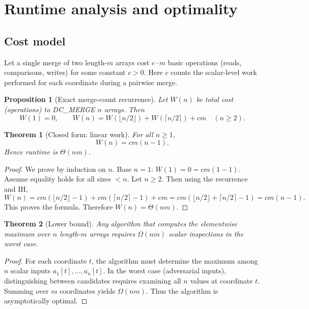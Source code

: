 \documentclass[11pt]{article}
\newtheorem{theorem}{Theorem}
\newtheorem{proposition}{Proposition}
\begin{document}
\section{Runtime analysis and optimality}
\subsection{Cost model}
Let a single merge of two length-\(m\) arrays cost \(c\cdot m\) basic operations (reads, comparisons, writes) for some constant \(c>0\). Here \(c\) counts the scalar-level work performed for each coordinate during a pairwise merge.

\begin{proposition}[Exact merge-count recurrence]
Let \(W(n)\) be total cost (operations) to DC\_MERGE \(n\) arrays. Then
\[
W(1)=0,\qquad
W(n) = W(\lfloor n/2\rfloor) + W(\lceil n/2\rceil) + c m \quad (n\ge 2).
\]
\end{proposition}

\begin{theorem}[Closed form: linear work]
For all \(n\ge 1\),
\[
W(n) = c m (n-1).
\]
Hence runtime is \(\Theta(nm)\).
\end{theorem}

\begin{proof}
We prove by induction on \(n\). Base \(n=1\): \(W(1)=0=c m (1-1)\). Assume equality holds for all sizes \(<n\). Let \(n\ge2\). Then using the recurrence and IH,
\[
W(n) = c m (\lfloor n/2\rfloor -1) + c m (\lceil n/2\rceil -1) + c m
= c m (\lfloor n/2\rfloor + \lceil n/2\rceil -1)
= c m (n-1).
\]
This proves the formula. Therefore \(W(n)=\Theta(nm)\).
\end{proof}

\begin{theorem}[Lower bound]
Any algorithm that computes the elementwise maximum over \(n\) length-\(m\) arrays requires \(\Omega(nm)\) scalar inspections in the worst case.
\end{theorem}
\begin{proof}
For each coordinate \(t\), the algorithm must determine the maximum among \(n\) scalar inputs \(a_1[t],\dots,a_n[t]\). In the worst case (adversarial inputs), distinguishing between candidates requires examining all \(n\) values at coordinate \(t\). Summing over \(m\) coordinates yields \(\Omega(nm)\). Thus the algorithm is asymptotically optimal.
\end{proof}
\end{document}
